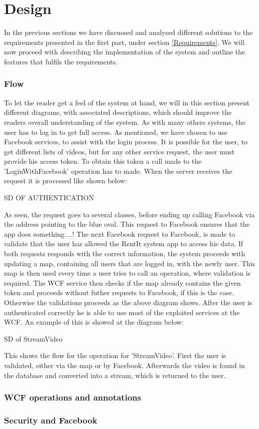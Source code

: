 \part{Design}
In the previous sections we have discussed and analysed different solutions to the requirements presented in the first part, under section \ref{Requirements}. We will now proceed with describing the implementation of the system and outline the features that fulfils the requirements.

\section{Flow}
To let the reader get a feel of the system at hand, we will in this section present different diagrams, with associated descriptions, which should improve the readers overall understanding of the system.
As with many others systems, the user has to log in to get full access. As mentioned, we have chosen to use Facebook services, to assist with the login process. It is possible for the user, to get different lists of videos, but for any other service request, the user must provide his access token. To obtain this token a call made to the 'LoginWithFacebook' operation has to made. When the server receives the request it is processed like shown below:

SD OF AUTHENTICATION

As seen, the request goes to several classes, before ending up calling Facebook via the address pointing to the blue oval. This request to Facebook ensures that the app does something....!
The next Facebook request to Facebook, is made to validate that the user has allowed the RentIt system app to access his data. If both requests responds with the correct information, the system proceeds with updating a map, containing all users that are logged in, with the newly user. This map is then used every time a user tries to call an operation, where validation is required. The WCF service then checks if the map already contains the given token and proceeds without futher requests to Facebook, if this is the case. Otherwise the validations proceeds as the above diagram shows. 
After the user is authenticated correctly he is able to use most of the exploited services at the WCF. An example of this is showed at the diagram below:

SD of StreamVideo

This shows the flow for the operation for 'StreamVideo'. First the user is validated, either via the map or by Facebook. Afterwards the video is found in the database and converted into a stream, which is returned to the user. 


\section{WCF operations and annotations}


\section{Security and Facebook}

